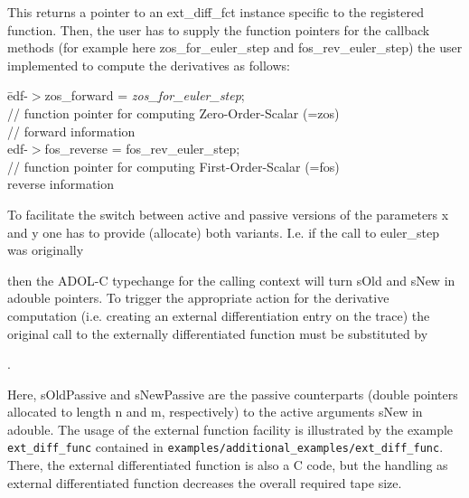 \documentclass[11pt,twoside]{article}
\begin{document}
\noindent
This returns a pointer to an {\sf ext\_diff\_fct} instance specific to the registered function. 
Then, the user has to supply the function pointers for the callback methods (for example here 
{\sf zos\_for\_euler\_step} and {\sf  fos\_rev\_euler\_step}) the user implemented 
to compute the derivatives as follows:
\begin{tabbing}
\hspace*{2cm}\= {\sf edf-$>$zos\_forward = {\em zos\_for\_euler\_step};}\\
             \> {\sf // function pointer for computing
               Zero-Order-Scalar (=zos)}\\
             \> {\sf // forward information}\\
             \> {\sf edf-$>$fos\_reverse = fos\_rev\_euler\_step;} \\
             \> {\sf // function pointer for computing
               First-Order-Scalar (=fos)}\\ 
             \> {\sf reverse information}
\end{tabbing}
To facilitate the switch between active and passive versions of the parameters {\sf x} and {\sf y}
one has to provide (allocate) both variants. I.e. if the call to {\sf euler\_step} was originally
\smallskip

\noindent
\hspace*{2cm}{\sf rc=euler\_step(n, sOld, m, sNew);}
\medskip

\noindent
then the ADOL-C typechange for the calling context will turn  {\sf sOld} and {\sf sNew} in {\sf adouble} pointers.
To trigger the appropriate action for the derivative computation (i.e. creating an external differentiation entry on the trace) 
the original call to the externally differentiated function 
must be substituted by 
\smallskip

\noindent
\hspace*{2cm}{\sf rc=call\_ext\_fct(edf, n, sOldPassive, sOld, m, sNewPassive, sNew);} .
\medskip

\noindent
Here, {\sf sOldPassive} and {\sf sNewPassive} are the passive counterparts ({\sf double} pointers allocated to length {\sf n} and {\sf m}, respectively)  
to the active arguments {\sf sNew} in {\sf adouble}.
The usage of the external function facility is illustrated by the
example \verb=ext_diff_func= contained in
\verb=examples/additional_examples/ext_diff_func=.
There, the external differentiated function is also a C code, but the
handling as external differentiated function decreases the
overall required tape size.
\end{document}
